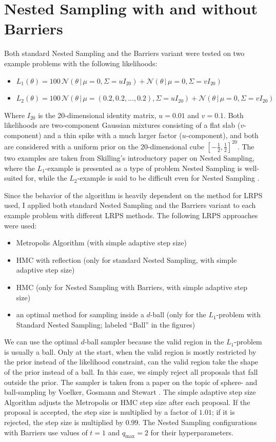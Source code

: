 \documentclass[12pt, a4paper]{report}
\begin{document}
\section{Nested Sampling with and without Barriers}
Both standard Nested Sampling and the Barriers variant were tested on two example problems with the following likelihoods:
\begin{itemize}
    \item $L_1(\theta) = 100 \, \mathcal{N}(\theta \,|\, \mu=0, \Sigma= u I_{20}) + \mathcal{N}(\theta \,|\, \mu=0, \Sigma= v I_{20})$
    \item $L_2(\theta) = 100 \, \mathcal{N}(\theta \,|\, \mu=(0.2, 0.2, ..., 0.2), \Sigma= u I_{20}) + \mathcal{N}(\theta \,|\, \mu=0, \Sigma= v I_{20})$
\end{itemize}
Where $I_{20}$ is the 20-dimensional identity matrix, $u = 0.01$ and $v = 0.1$.
Both likelihoods are two-component Gaussian mixtures consisting of a flat slab ($v$-component) and a thin spike with a much larger factor ($u$-component), and both are considered with a uniform prior on the 20-dimensional cube $[-\frac{1}{2}, \frac{1}{2}]^{20}$.
The two examples are taken from Skilling's introductory paper on Nested Sampling, where the $L_1$-example is presented as a type of problem Nested Sampling is well-suited for, while the $L_2$-example is said to be difficult even for Nested Sampling \cite[21]{skilling}.

Since the behavior of the algorithm is heavily dependent on the method for LRPS used, I applied both standard Nested Sampling and the Barriers variant to each example problem with different LRPS methods.
The following LRPS approaches were used:
\begin{itemize}
    \item Metropolis Algorithm (with simple adaptive step size)
    \item HMC with reflection (only for standard Nested Sampling, with simple adaptive step size)
    \item HMC (only for Nested Sampling with Barriers, with simple adaptive step size)
    \item an optimal method for sampling inside a $d$-ball (only for the $L_1$-problem with Standard Nested Sampling; labeled ``Ball'' in the figures)  
\end{itemize}
We can use the optimal $d$-ball sampler because the valid region in the $L_1$-problem is usually a ball.
Only at the start, when the valid region is mostly restricted by the prior instead of the likelihood constraint, can the valid region take the shape of the prior instead of a ball.
In this case, we simply reject all proposals that fall outside the prior.
The sampler is taken from a paper on the topic of sphere- and ball-sampling by Voelker, Gosmann and Stewart \cite[2]{sphere_sampling}.
The simple adaptive step size Algorithm adjusts the Metropolis or HMC step size after each proposal.
If the proposal is accepted, the step size is multiplied by a factor of $1.01$; if it is rejected, the step size is multiplied by $0.99$.
The Nested Sampling configurations with Barriers use values of $t=1$ and $q_{\textrm{max}} = 2$ for their hyperparameters.
\end{document}

